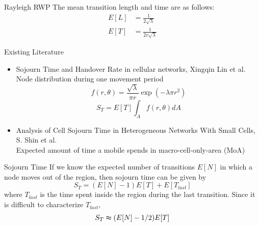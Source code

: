 \documentclass{beamer}
\begin{document}
\begin{frame}{Rayleigh RWP }
The mean transition length and time are as follows:
\vspace{0.75cm}
\begin{align*}
	E[L] &= \frac{1}{2\sqrt{\lambda}} \\[4ex]
	E[T] &= \frac{1}{2v\sqrt{\lambda}}
\end{align*}
\end{frame}

\begin{frame}{Existing Literature} {}
\begin{itemize}
\item
Sojourn Time and Handover Rate in cellular networks, Xingqin Lin et al. \\
\pause
Node distribution during one movement period
\begin{equation*}
f(r,\theta) = \frac{\sqrt{\lambda}}{\pi r} \exp(-\lambda \pi r^2) 
\end{equation*}
\pause
\begin{equation*}
S_T = E[T] \int_A f(r,\theta) dA
\end{equation*}
\pause
\item Analysis of Cell Sojourn Time in Heterogeneous Networks With Small Cells, S. Shin et al. \\
Expected amount of time a mobile spends in macro-cell-only-area (MoA) \\
\end{itemize}

\end{frame}



\begin{frame}{Sojourn Time}{}
	If we know the expected number of transitions $E[N]$ in which a node moves out of the
region, then sojourn time can be given by
\begin{equation*}
	S_T = (E[N]-1)E[T] + E[T_{last}]
\end{equation*}
where $T_{last}$ is the time spent inside the region during the last transition.
Since it is difficult to characterize $T_{last}$, \\
\begin{equation*}
S_T  \thickapprox (E[N]-1/2)E[T]
\end{equation*}
\end{frame}
\end{document}
